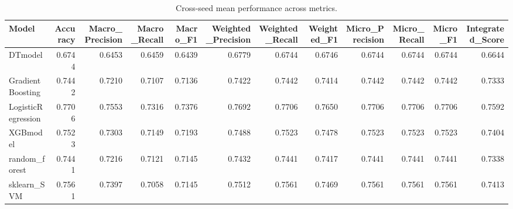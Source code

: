 \begin{table}[t]
\centering
\begin{tabular}{lrrrrrrrrrrr}
\toprule
Model & Accuracy & Macro_Precision & Macro_Recall & Macro_F1 & Weighted_Precision & Weighted_Recall & Weighted_F1 & Micro_Precision & Micro_Recall & Micro_F1 & Integrated_Score \\
\midrule
DTmodel & 0.6744 & 0.6453 & 0.6459 & 0.6439 & 0.6779 & 0.6744 & 0.6746 & 0.6744 & 0.6744 & 0.6744 & 0.6644 \\
GradientBoosting & 0.7442 & 0.7210 & 0.7107 & 0.7136 & 0.7422 & 0.7442 & 0.7414 & 0.7442 & 0.7442 & 0.7442 & 0.7333 \\
LogisticRegression & 0.7706 & 0.7553 & 0.7316 & 0.7376 & 0.7692 & 0.7706 & 0.7650 & 0.7706 & 0.7706 & 0.7706 & 0.7592 \\
XGBmodel & 0.7523 & 0.7303 & 0.7149 & 0.7193 & 0.7488 & 0.7523 & 0.7478 & 0.7523 & 0.7523 & 0.7523 & 0.7404 \\
random_forest & 0.7441 & 0.7216 & 0.7121 & 0.7145 & 0.7432 & 0.7441 & 0.7417 & 0.7441 & 0.7441 & 0.7441 & 0.7338 \\
sklearn_SVM & 0.7561 & 0.7397 & 0.7058 & 0.7145 & 0.7512 & 0.7561 & 0.7469 & 0.7561 & 0.7561 & 0.7561 & 0.7413 \\
\bottomrule
\end{tabular}
\caption{Cross-seed mean performance across metrics.}
\label{tab:cross_seed_mean}
\end{table}